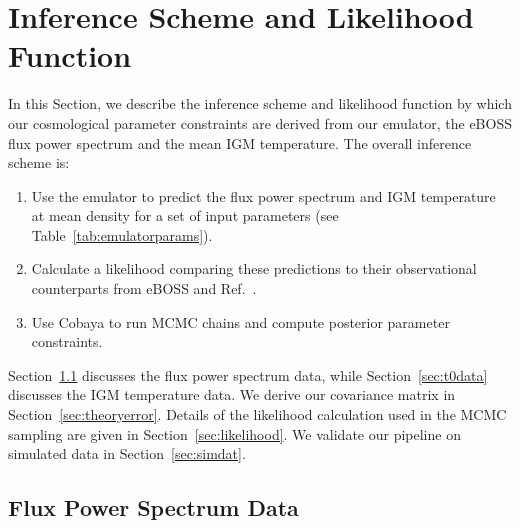 \section{Inference Scheme and Likelihood Function}\label{sec:inference}

In this Section, we describe the inference scheme and likelihood function by which our cosmological parameter constraints are derived from our emulator, the eBOSS flux power spectrum \cite{2019JCAP...07..017C} and the mean IGM temperature.
The overall inference scheme is:
\begin{enumerate}
    \item Use the emulator to predict the flux power spectrum and IGM temperature at mean density for a set of input parameters (see Table~\ref{tab:emulatorparams}).
    \item Calculate a likelihood comparing these predictions to their observational counterparts from eBOSS \cite{2019JCAP...07..017C} and Ref.~\cite{2021MNRAS.506.4389G}.
    \item Use Cobaya \cite{2021JCAP...05..057T, 2019ascl.soft10019T} to run MCMC chains and compute posterior parameter constraints.
\end{enumerate}
Section~\ref{sec:fpsdata} discusses the flux power spectrum data, while Section~\ref{sec:t0data} discusses the IGM temperature data.
We derive our covariance matrix in Section~\ref{sec:theoryerror}.
Details of the likelihood calculation used in the MCMC sampling are given in Section~\ref{sec:likelihood}.
We validate our pipeline on simulated data in Section~\ref{sec:simdat}.


\subsection{Flux Power Spectrum Data}
\label{sec:fpsdata}

